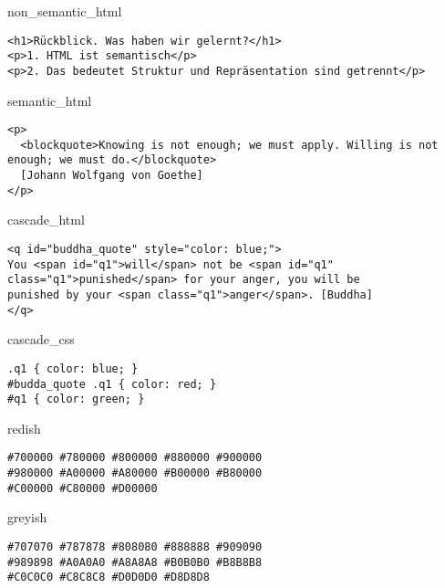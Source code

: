 \begin{chunk}{non_semantic_html}
\begin{lstlisting}[frame=single,xleftmargin=5mm, numberstyle=\tiny]
<h1>Rückblick. Was haben wir gelernt?</h1>
<p>1. HTML ist semantisch</p>
<p>2. Das bedeutet Struktur und Repräsentation sind getrennt</p>
\end{lstlisting}
\end{chunk}


\begin{chunk}{semantic_html}
\begin{lstlisting}[frame=single,xleftmargin=5mm, numberstyle=\tiny]
<p>
  <blockquote>Knowing is not enough; we must apply. Willing is not enough; we must do.</blockquote>
  [Johann Wolfgang von Goethe]
</p>
\end{lstlisting}
\end{chunk}



\begin{chunk}{cascade_html}
\begin{lstlisting}[frame=single,xleftmargin=5mm, numberstyle=\tiny]
<q id="buddha_quote" style="color: blue;">
You <span id="q1">will</span> not be <span id="q1" class="q1">punished</span> for your anger, you will be
punished by your <span class="q1">anger</span>. [Buddha]
</q>
\end{lstlisting}
\end{chunk}

\begin{chunk}{cascade_css}
\begin{lstlisting}[frame=single,xleftmargin=5mm, numberstyle=\tiny]
.q1 { color: blue; }
#budda_quote .q1 { color: red; }
#q1 { color: green; }
\end{lstlisting}
\end{chunk}



\begin{chunk}{redish}
\begin{lstlisting}[frame=single,xleftmargin=5mm, numberstyle=\tiny]
#700000 #780000 #800000 #880000 #900000
#980000 #A00000 #A80000 #B00000 #B80000
#C00000 #C80000 #D00000
\end{lstlisting}
\end{chunk}

\begin{chunk}{greyish}
\begin{lstlisting}[frame=single,xleftmargin=5mm, numberstyle=\tiny]
#707070 #787878 #808080 #888888 #909090
#989898 #A0A0A0 #A8A8A8 #B0B0B0 #B8B8B8
#C0C0C0 #C8C8C8 #D0D0D0 #D8D8D8
\end{lstlisting}
\end{chunk}
